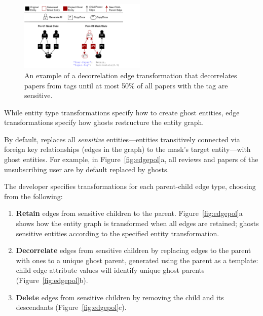 \begin{figure}[t!]
    \centering
    \includegraphics[width=0.54\textwidth]{img/child-parent}

    \caption{An example of a decorrelation edge transformation that decorrelates papers from tags
    until at most 50\% of all papers with the tag are sensitive.
    }
    \label{fig:sensitivity}
\end{figure}

While entity type transformations specify how to create ghost entities, edge transformations 
specify how ghosts restructure the entity graph.

By default, \sys replaces all \emph{sensitive} entities---entities transitively connected via foreign key
relationships (edges in the graph) to the mask's target entity---with ghost entities.
For example, in Figure~\ref{fig:edgepol}a, all reviews and papers of the unsubscribing user are by
default replaced by ghosts.


The developer specifies transformations for each parent-child edge type, choosing from the following:
\begin{enumerate}
    \item \textbf{Retain} edges from sensitive children to the parent. Figure~\ref{fig:edgepol}a
        shows how the entity graph is transformed when all edges are retained; \sys ghosts
        sensitive entities according to the specified entity transformation.
    \item \textbf{Decorrelate} edges from sensitive children by replacing edges to the parent with
        ones to a unique ghost parent, generated using the parent as a template:
        child edge attribute values will identify unique ghost parents (Figure~\ref{fig:edgepol}b).
    \item \textbf{Delete} edges from sensitive children by removing the child and its descendants
        (Figure~\ref{fig:edgepol}c).
\end{enumerate}

